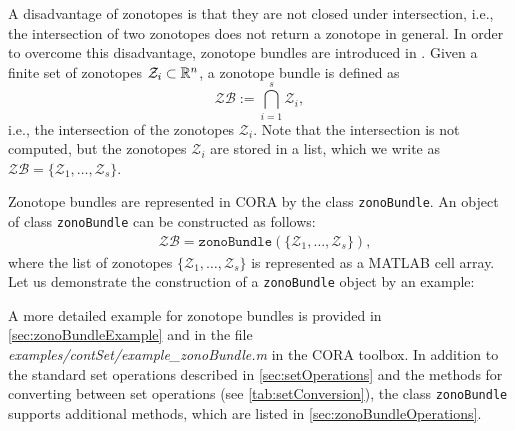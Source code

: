  \label{sec:zonoBundle}

\normalsize
A disadvantage of zonotopes is that they are not closed under intersection, i.e., the intersection of two zonotopes does not return a zonotope in general. In order to overcome this disadvantage, zonotope bundles are introduced in \cite{Althoff2011f}. Given a finite set of zonotopes $\mathcal{Z}_i \subset \mathbb{R}^n$, a zonotope bundle is defined as 
\begin{equation} 
\mathcal{ZB} := \bigcap_{i=1}^{s} \mathcal{Z}_i,
\end{equation}
i.e., the intersection of the zonotopes $\mathcal{Z}_i$. Note that the intersection is not computed, but the zonotopes $\mathcal{Z}_i$ are stored in a list, which we write as $\mathcal{ZB} = \{ \mathcal{Z}_1, \ldots, \mathcal{Z}_s\}$.

Zonotope bundles are represented in CORA by the class \texttt{zonoBundle}. An object of class \texttt{zonoBundle} can be constructed as follows:
\begin{equation*}
	\begin{split}
		& \mathcal{ZB} = \texttt{zonoBundle}(\{ \mathcal{Z}_1, \ldots, \mathcal{Z}_s\}),
	\end{split}
\end{equation*} 
where the list of zonotopes $\{ \mathcal{Z}_1, \ldots, \mathcal{Z}_s\}$ is represented as a MATLAB cell array. Let us demonstrate the construction of a \texttt{zonoBundle} object by an example:

\begin{center}
\begin{minipage}[t]{0.5\textwidth}
	\vspace{15pt}
	\footnotesize
	
\end{minipage}
\begin{minipage}[t]{0.3\textwidth}
	\vspace{0pt}
	\centering
\end{minipage}
\end{center} 

A more detailed example for zonotope bundles is provided in \cref{sec:zonoBundleExample} and in the file \textit{examples/contSet/example\_zonoBundle.m} in the CORA toolbox. In addition to the standard set operations described in \cref{sec:setOperations} and the methods for converting between set operations (see \cref{tab:setConversion}), the class \texttt{zonoBundle} supports additional methods, which are listed in \cref{sec:zonoBundleOperations}.
